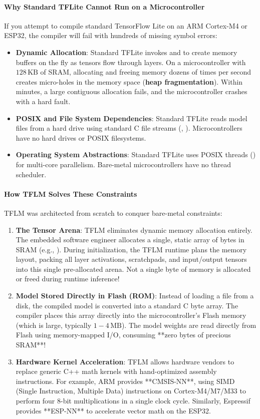 \paragraph{Why Standard TFLite Cannot Run on a Microcontroller}
If you attempt to compile standard TensorFlow Lite on an ARM Cortex-M4 or ESP32, the compiler will fail with hundreds of missing symbol errors:
\begin{itemize}
    \item \textbf{Dynamic Allocation}: Standard TFLite invokes  and  to create memory buffers on the fly as tensors flow through layers. On a microcontroller with $128\,\text{KB}$ of SRAM, allocating and freeing memory dozens of times per second creates micro-holes in the memory space (\textbf{heap fragmentation}). Within minutes, a large contiguous allocation fails, and the microcontroller crashes with a hard fault.
    \item \textbf{POSIX and File System Dependencies}: Standard TFLite reads  model files from a hard drive using standard C file streams (, ). Microcontrollers have no hard drives or POSIX filesystems.
    \item \textbf{Operating System Abstractions}: Standard TFLite uses POSIX threads () for multi-core parallelism. Bare-metal microcontrollers have no thread scheduler.
\end{itemize}

\paragraph{How TFLM Solves These Constraints}
TFLM was architected from scratch to conquer bare-metal constraints:
\begin{enumerate}
    \item \textbf{The Tensor Arena}: TFLM eliminates dynamic memory allocation entirely. The embedded software engineer allocates a single, static array of bytes in SRAM (e.g., ). During initialization, the TFLM runtime plans the memory layout, packing all layer activations, scratchpads, and input/output tensors into this single pre-allocated arena. Not a single byte of memory is allocated or freed during runtime inference!
    \item \textbf{Model Stored Directly in Flash (ROM)}: Instead of loading a file from a disk, the compiled  model is converted into a standard C  byte array. The compiler places this array directly into the microcontroller's Flash memory (which is large, typically $1 - 4\,\text{MB}$). The model weights are read directly from Flash using memory-mapped I/O, consuming **zero bytes of precious SRAM**!
    \item \textbf{Hardware Kernel Acceleration}: TFLM allows hardware vendors to replace generic C++ math kernels with hand-optimized assembly instructions. For example, ARM provides **CMSIS-NN**, using SIMD (Single Instruction, Multiple Data) instructions on Cortex-M4/M7/M33 to perform four 8-bit multiplications in a single clock cycle. Similarly, Espressif provides **ESP-NN** to accelerate vector math on the ESP32.
\end{enumerate}

